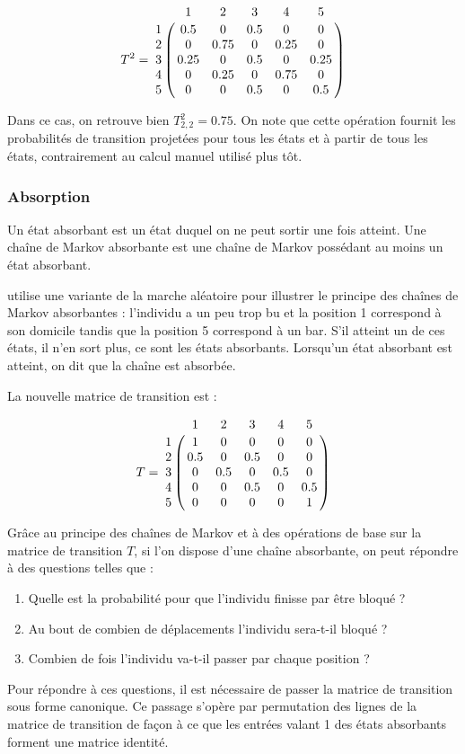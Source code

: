 \documentclass[12pt]{article}
\begin{document}
$$
T^2 = \bordermatrix{
    & 1 & 2 & 3 & 4 & 5 \cr
  1 & 0.5 & 0 & 0.5 & 0 & 0 \cr
  2 & 0 & 0.75 & 0 & 0.25 & 0 \cr
  3 & 0.25 & 0 & 0.5 & 0 & 0.25 \cr
  4 & 0 & 0.25 & 0 & 0.75 & 0 \cr
  5 & 0 & 0 & 0.5 & 0 & 0.5 \cr
}
$$
\vspace{0.5cm}

Dans ce cas, on retrouve bien $T^2_{2,2} = 0.75$. On note que cette
opération fournit les probabilités de transition projetées pour tous
les états et à partir de tous les états, contrairement au calcul
manuel utilisé plus tôt.

\subsubsection{Absorption}

Un état absorbant est un état duquel on ne peut sortir une fois
atteint. Une chaîne de Markov absorbante est une chaîne de Markov
possédant au moins un état absorbant.

\cite{snell} utilise une variante de la marche aléatoire pour
illustrer le principe des chaînes de Markov absorbantes : l'individu a
un peu trop bu et la position 1 correspond à son domicile tandis que
la position 5 correspond à un bar. S'il atteint un de ces états, il
n'en sort plus, ce sont les états absorbants. Lorsqu'un état absorbant
est atteint, on dit que la chaîne est absorbée.

La nouvelle matrice de transition est :

$$
T = \bordermatrix{
    & 1 & 2 & 3 & 4 & 5 \cr
  1 & 1 & 0 & 0 & 0 & 0 \cr
  2 & 0.5 & 0 & 0.5 & 0 & 0 \cr
  3 & 0 & 0.5 & 0 & 0.5 & 0 \cr
  4 & 0 & 0 & 0.5 & 0 & 0.5 \cr
  5 & 0 & 0 & 0 & 0 & 1 \cr
}
$$
\vspace{0.5cm}

Grâce au principe des chaînes de Markov et à des opérations de base
sur la matrice de transition $T$, si l'on dispose d'une chaîne
absorbante, on peut répondre à des questions telles que :

\begin{enumerate}
  \item{Quelle est la probabilité pour que l'individu finisse par être
    bloqué ?}
  \item{Au bout de combien de déplacements l'individu sera-t-il
    bloqué ?}
  \item{Combien de fois l'individu va-t-il passer par chaque position ?}
\end{enumerate}

Pour répondre à ces questions, il est nécessaire de passer la matrice de
transition sous forme canonique. Ce passage s'opère par permutation
des lignes de la matrice de transition de façon à ce que les entrées
valant 1 des états absorbants forment une matrice identité.
\end{document}
